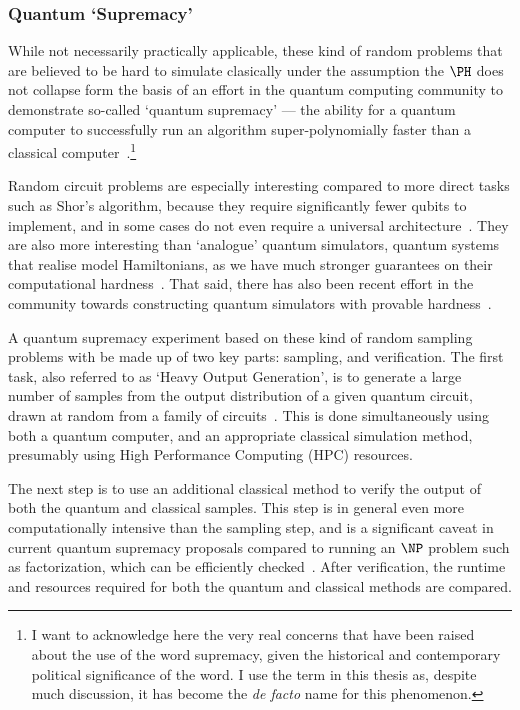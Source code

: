 \subsubsection{Quantum `Supremacy'}
While not necessarily practically applicable, these kind of random problems that are believed to be hard to simulate clasically under the assumption the $\PH$ does not collapse form the basis of an effort in the quantum computing community to demonstrate so-called `quantum supremacy' --- the ability for a quantum computer to successfully run an algorithm super-polynomially faster than a classical computer~\cite{Preskill2012}.\footnote{I want to acknowledge here the very real concerns that have been raised about the use of the word supremacy, given the historical and contemporary political significance of the word. I use the term in this thesis as, despite much discussion, it has become the \emph{de facto} name for this phenomenon.}
\par
Random circuit problems are especially interesting compared to more direct tasks such as Shor's algorithm, because they require significantly fewer qubits to implement, and in some cases do not even require a universal architecture~\cite{Montanaro2017}. They are also more interesting than `analogue' quantum simulators, quantum systems that realise model Hamiltonians, as we have much stronger guarantees on their computational hardness~\cite{Montanaro2017}. That said, there has also been recent effort in the community towards constructing quantum simulators with provable hardness~\cite{Hangleiter2017,Gao2017,BermejoVega2018,Haferkamp2019}.\par
A quantum supremacy experiment based on these kind of random sampling problems with be made up of two key parts: sampling, and verification. The first task, also referred to as `Heavy Output Generation', is to generate a large number of samples from the output distribution of a given quantum circuit, drawn at random from a family of circuits~\cite{Aaronson2016}. This is done simultaneously using both a quantum computer, and an appropriate classical simulation method, presumably using High Performance Computing (HPC) resources.\par
The next step is to use an additional classical method to verify the output of both the quantum and classical samples. This step is in general even more computationally intensive than the sampling step, and is a significant caveat in current quantum supremacy proposals compared to running an $\NP$ problem such as factorization, which can be efficiently checked~\cite{Harrow2017}. After verification, the runtime and resources required for both the quantum and classical methods are compared.\par
